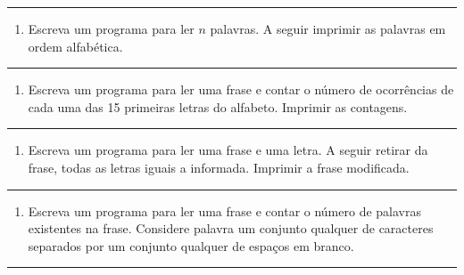 \documentclass[12pt,a4paper]{article}
\renewcommand{\linethickness}{0.05em}
\providecommand{\tightlist}{%
      \setlength{\itemsep}{0pt}\setlength{\parskip}{0pt}}
\begin{document}
    \begin{center}\rule{0.5\linewidth}{\linethickness}\end{center}

\begin{enumerate}
\def\labelenumi{\arabic{enumi}.}
\setcounter{enumi}{21}
\tightlist
\item
  Escreva um programa para ler \(n\) palavras. A seguir imprimir as
  palavras em ordem alfabética.
\end{enumerate}

    \begin{center}\rule{0.5\linewidth}{\linethickness}\end{center}

\begin{enumerate}
\def\labelenumi{\arabic{enumi}.}
\setcounter{enumi}{22}
\tightlist
\item
  Escreva um programa para ler uma frase e contar o número de
  ocorrências de cada uma das 15 primeiras letras do alfabeto. Imprimir
  as contagens.
\end{enumerate}

    \begin{center}\rule{0.5\linewidth}{\linethickness}\end{center}

\begin{enumerate}
\def\labelenumi{\arabic{enumi}.}
\setcounter{enumi}{23}
\tightlist
\item
  Escreva um programa para ler uma frase e uma letra. A seguir retirar
  da frase, todas as letras iguais a informada. Imprimir a frase
  modificada.
\end{enumerate}

    \begin{center}\rule{0.5\linewidth}{\linethickness}\end{center}

\begin{enumerate}
\def\labelenumi{\arabic{enumi}.}
\setcounter{enumi}{24}
\tightlist
\item
  Escreva um programa para ler uma frase e contar o número de palavras
  existentes na frase. Considere palavra um conjunto qualquer de
  caracteres separados por um conjunto qualquer de espaços em branco.
\end{enumerate}

    \begin{center}\rule{0.5\linewidth}{\linethickness}\end{center}
\end{document}

